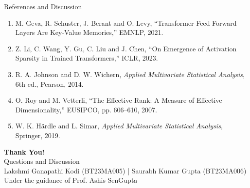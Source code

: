 \documentclass[aspectratio=169,10pt]{beamer}
\begin{document}
\begin{frame}{References and Discussion}
\small
\begin{enumerate}
  \item M. Geva, R. Schuster, J. Berant and O. Levy, ``Transformer Feed-Forward Layers Are Key-Value Memories,'' EMNLP, 2021.
  \item Z. Li, C. Wang, Y. Gu, C. Liu and J. Chen, ``On Emergence of Activation Sparsity in Trained Transformers,'' ICLR, 2023.
  \item R. A. Johnson and D. W. Wichern, \emph{Applied Multivariate Statistical Analysis}, 6th ed., Pearson, 2014.
  \item O. Roy and M. Vetterli, ``The Effective Rank: A Measure of Effective Dimensionality,'' EUSIPCO, pp. 606--610, 2007.
  \item W. K. H\"ardle and L. Simar, \emph{Applied Multivariate Statistical Analysis}, Springer, 2019.
\end{enumerate}
\vspace{0.35cm}
\begin{center}
{\color{ForestTeal}\Huge\bfseries Thank You!}\\[5pt]
{\Large Questions and Discussion}\\[0.55cm]
{\normalsize Lakshmi Ganapathi Kodi (BT23MA005) \quad | \quad Saurabh Kumar Gupta (BT23MA006)}\\[3pt]
{\small Under the guidance of Prof. Ashis SenGupta}
\end{center}
\end{frame}
\end{document}
